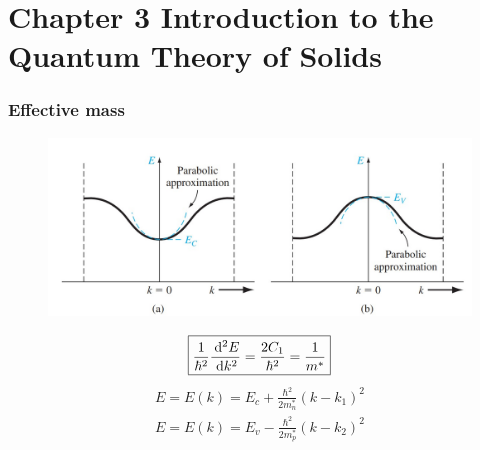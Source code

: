 \documentclass{beamer}
\begin{document}
\section{Chapter 3 Introduction to the Quantum Theory of Solids}
    \begin{frame} \frametitle{Effective mass}
        \begin{figure}[H]
            \vspace{-0.5em}
            \centering
            \includegraphics[width=0.8\linewidth]{Effective-mass.jpg}
            \label{fig:Effective-mass.jpg}
            \vspace{-0.5em}
        \end{figure}

        \begin{equation*}
            \boxed{\frac{1}{\hbar^2} \frac{\: \mathrm{d}^2 E}{\: \mathrm{d} k^2} = \frac{2C_1}{\hbar^2} = \frac{1}{m^*}  }
        \end{equation*}
        \begin{equation*}
            \begin{aligned}
                E = E(k) = E_c + \frac{\hbar^2}{2m_n^*} (k - k_1)^2 \\
                E = E(k) = E_v - \frac{\hbar^2}{2m_p^*} (k - k_2)^2
            \end{aligned}
        \end{equation*}
    \end{frame}
\end{document}
